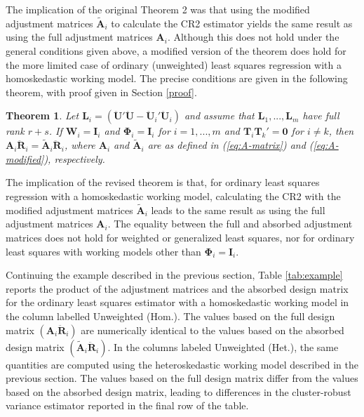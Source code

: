 \documentclass[12pt]{article}
\newtheorem*{thm}{Theorem}
\begin{document}
The implication of the original Theorem 2 was that using the modified
adjustment matrices \(\tilde{\mathbf{A}}_i\) to calculate the CR2
estimator yields the same result as using the full adjustment matrices
\(\mathbf{A}_i\). Although this does not hold under the general
conditions given above, a modified version of the theorem does hold for
the more limited case of ordinary (unweighted) least squares regression
with a homoskedastic working model. The precise conditions are given in
the following theorem, with proof given in Section \ref{proof}.

\begin{thm}
\label{thm:absorb}
Let $\mathbf{L}_i = \left(\mathbf{\ddot{U}}'\mathbf{\ddot{U}} - \mathbf{\ddot{U}}_i'\mathbf{\ddot{U}}_i\right)$ and assume that $\mathbf{L}_1,...,\mathbf{L}_m$ have full rank $r + s$. If $\mathbf{W}_i = \mathbf{I}_i$ and $\boldsymbol\Phi_i = \mathbf{I}_i$ for $i = 1,...,m$ and $\mathbf{T}_i \mathbf{T}_k' = \mathbf{0}$ for $i \neq k$, then $\mathbf{A}_i \mathbf{\ddot{R}}_i = \mathbf{\tilde{A}}_i \mathbf{\ddot{R}}_i$, where $\mathbf{A}_i$ and $\tilde{\mathbf{A}}_i$ are as defined in (\ref{eq:A-matrix}) and (\ref{eq:A-modified}), respectively.
\end{thm}

The implication of the revised theorem is that, for ordinary least
squares regression with a homoskedastic working model, calculating the
CR2 with the modified adjustment matrices \(\tilde{\mathbf{A}}_i\) leads
to the same result as using the full adjustment matrices
\(\mathbf{A}_i\). The equality between the full and absorbed adjustment
matrices does not hold for weighted or generalized least squares, nor
for ordinary least squares with working models other than
\(\boldsymbol\Phi_i = \mathbf{I}_i\).

Continuing the example described in the previous section, Table
\ref{tab:example} reports the product of the adjustment matrices and the
absorbed design matrix for the ordinary least squares estimator with a
homoskedastic working model in the column labelled Unweighted (Hom.).
The values based on the full design matrix
\(\left(\mathbf{A}_i \mathbf{\ddot{R}}_i\right)\) are numerically
identical to the values based on the absorbed design matrix
\(\left(\mathbf{\tilde{A}}_i \mathbf{\ddot{R}}_i\right)\). In the
columns labeled Unweighted (Het.), the same quantities are computed
using the heteroskedastic working model described in the previous
section. The values based on the full design matrix differ from the
values based on the absorbed design matrix, leading to differences in
the cluster-robust variance estimator reported in the final row of the
table.
\end{document}
